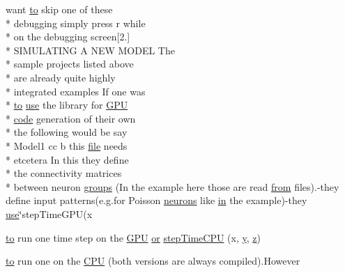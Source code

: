 \begin{DoxyCompactItemize}
want \hyperlink{README_8txt_add1f2ee32acc15ef77f839d4382c9768}{to} skip one of these \\*
debugging simply press r while \\*
on the debugging screen\mbox{[}2.\mbox{]} \\*
S\+I\+M\+U\+L\+A\+T\+I\+N\+G A N\+E\+W M\+O\+D\+E\+L The \\*
sample projects listed above \\*
are already quite highly \\*
integrated examples If one was \\*
\hyperlink{README_8txt_add1f2ee32acc15ef77f839d4382c9768}{to} \hyperlink{README_8txt_acf386c48a14a2099c9220d6bcde40fc8}{use} the library for \hyperlink{modelSpec_8h_a39cb9803524b6f3b783344b2f89867b4}{G\+P\+U} \\*
\hyperlink{userproject_2MBody__userdef__project_2README_8txt_aeec4e596748e7c29dd5548dae4c70685}{code} generation of their own \\*
the following would be say \\*
Model1 cc b this \hyperlink{README_8txt_a6f45b2930c1b79b67034355b4701dc56}{file} needs \\*
etcetera In this they define \\*
the connectivity matrices \\*
between neuron \hyperlink{README_8txt_a7517205ac314873d8c5358b4a4e6eb79}{groups} (In the example here those are read \hyperlink{README_8txt_aa96a977025ecc6f44756d8c7ce4f7674}{from} files).-\/they define input patterns(e.\+g.\+for Poisson \hyperlink{userproject_2SynDelay__project_2README_8txt_a70f8ce34c10b15b6e0f669ff7bb2f696}{neurons} like \hyperlink{README_8txt_a148897a6b2cc9cff25af80abb13426b0}{in} the example)-\/they \hyperlink{README_8txt_acf386c48a14a2099c9220d6bcde40fc8}{use}\char`\"{}step\+Time\+G\+P\+U(x
\item 
\hyperlink{README_8txt_add1f2ee32acc15ef77f839d4382c9768}{to} run one time step on the \hyperlink{modelSpec_8h_a39cb9803524b6f3b783344b2f89867b4}{G\+P\+U} \hyperlink{userproject_2PoissonIzh__project_2README_8txt_ad4021097ab0ba066271614bf3f4c2e27}{or} \hyperlink{README_8txt_a5b0d9000b9be5b49116359e2c65ec0a0}{step\+Time\+C\+P\+U} (x, \hyperlink{README_8txt_a920a9c177ac2efcc655675077d034047}{y}, \hyperlink{README_8txt_aafdc1369e947728304a2911ed1b087c1}{z})
\item 
\hyperlink{README_8txt_add1f2ee32acc15ef77f839d4382c9768}{to} run one on the \hyperlink{README_8txt_a74a069e3c75797de2636c4dd14daa147}{C\+P\+U} (both versions are always compiled).However

\end{DoxyCompactItemize}
